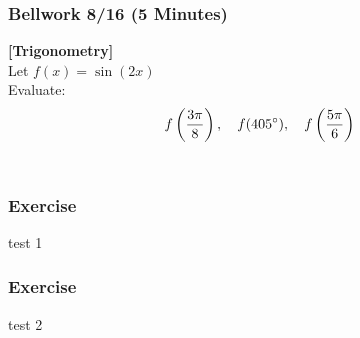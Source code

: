 \documentclass[12pt]{beamer}
\begin{document}
\begin{frame}
	\frametitle{Bellwork 8/16 (5 Minutes)}
	\initclock
	\textbf{[Trigonometry]}\vspace{.2cm}\\
	\vspace*{\fill}
	Let $f(x) = \sin(2x)$\\
	\vspace*{\fill}
	Evaluate: \[f\left(\frac{3\pi}{8}\right),\quad f(405\degree),\quad f\left(\frac{5\pi}{6}\right)\]\\
	\vspace*{\fill}
	\vspace*{\fill}
	\vspace*{\fill}
	\vspace*{\fill}
	\vspace*{\fill}
	\vspace*{\fill}
	\crono
\end{frame}
\begin{frame}
	\frametitle{Exercise}
	\vspace*{\fill}
	\vspace*{\fill}
	\vspace*{\fill}
	\vspace*{\fill}
	\initclock
	test 1\\
	\vspace*{\fill}
	\vspace*{\fill}
	\vspace*{\fill}
	\vspace*{\fill}
	\crono
\end{frame}
\begin{frame}
	\frametitle{Exercise}
	\vspace*{\fill}
	\vspace*{\fill}
	\vspace*{\fill}
	\vspace*{\fill}
	\initclock
	test 2\\
	\vspace*{\fill}
	\vspace*{\fill}
	\vspace*{\fill}
	\vspace*{\fill}
	\crono
\end{frame}
\end{document}
